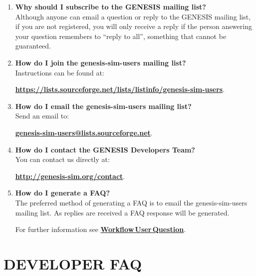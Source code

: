 \documentclass[12pt]{article}
\begin{document}
\begin{enumerate}

\item {\bf Why should I subscribe to the GENESIS mailing list?} \\
Although anyone can email a question or reply to the GENESIS mailing list, if you are not registered, you will only receive a reply if the person answering your question remembers to ``reply to all'', something that cannot be guaranteed.

\item {\bf How do I join the genesis-sim-users mailing list?} \\
Instructions can be found at:

\href{https://lists.sourceforge.net/lists/listinfo/genesis-sim-users}{\bf https://lists.sourceforge.net/lists/listinfo/genesis-sim-users}.

\item {\bf How do I email the genesis-sim-users mailing list?} \\
Send an email to:

\href{mailto:genesis-sim-users@lists.sourceforge.net}{\bf genesis-sim-users@lists.sourceforge.net}.

\item{\bf How do I contact the GENESIS Developers Team?} \\
You can contact us directly at:

\href{http://genesis-sim.org/contact}{\bf http://genesis-sim.org/contact}.

\item {\bf How do I generate a FAQ?} \\
The preferred method of generating a FAQ is to email the genesis-sim-users mailing list. As replies are received a FAQ response will be generated.

For further information see \href{../workflow-user-query/workflow-user-query.tex}{\bf Workflow\,User\,Question}.

\end{enumerate}

\section*{DEVELOPER FAQ}
\end{document}
